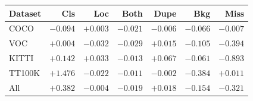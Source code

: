 \begin{tabular}{lrrrrrr}
\toprule
Dataset & Cls & Loc & Both & Dupe & Bkg & Miss\\
\midrule
COCO & $-0.094$ & $+0.003$ & $-0.021$ & $-0.006$ & $-0.066$ & $-0.007$\\
VOC & $+0.004$ & $-0.032$ & $-0.029$ & $+0.015$ & $-0.105$ & $-0.394$\\
KITTI & $+0.142$ & $+0.033$ & $-0.013$ & $+0.067$ & $-0.061$ & $-0.893$\\
TT100K & $+1.476$ & $-0.022$ & $-0.011$ & $-0.002$ & $-0.384$ & $+0.011$\\
All & $+0.382$ & $-0.004$ & $-0.019$ & $+0.018$ & $-0.154$ & $-0.321$\\
\bottomrule
\end{tabular}
